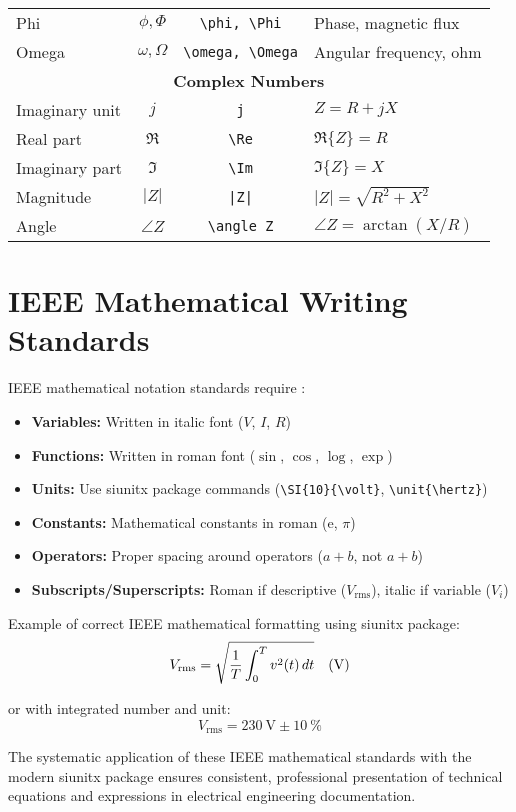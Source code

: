 \begin{table}[htbp]
{\begin{tabular}{|l|c|c|l|}
			Phi & $\phi, \Phi$ & \texttt{\textbackslash phi, \textbackslash Phi} & Phase, magnetic flux \\
			Omega & $\omega, \Omega$ & \texttt{\textbackslash omega, \textbackslash Omega} & Angular frequency, ohm \\
			\hline
			\multicolumn{4}{|c|}{\textbf{Complex Numbers}} \\
			\hline
			Imaginary unit & $j$ & \texttt{j} & $Z = R + jX$ \\
			Real part & $\Re$ & \texttt{\textbackslash Re} & $\Re\{Z\} = R$ \\
			Imaginary part & $\Im$ & \texttt{\textbackslash Im} & $\Im\{Z\} = X$ \\
			Magnitude & $|Z|$ & \texttt{|Z|} & $|Z| = \sqrt{R^2 + X^2}$ \\
			Angle & $\angle Z$ & \texttt{\textbackslash angle Z} & $\angle Z = \arctan(X/R)$ \\
			\hline
		\end{tabular}%
	}
\end{table}

\section{IEEE Mathematical Writing Standards}
\label{sec:ieee_math_standards}

IEEE mathematical notation standards require \cite{ieee2018style}:

\begin{itemize}
	\item \textbf{Variables:} Written in italic font ($V$, $I$, $R$)
	\item \textbf{Functions:} Written in roman font ($\sin$, $\cos$, $\log$, $\exp$)
	\item \textbf{Units:} Use siunitx package commands (\texttt{\textbackslash SI\{10\}\{\textbackslash volt\}}, \texttt{\textbackslash unit\{\textbackslash hertz\}})
	\item \textbf{Constants:} Mathematical constants in roman ($\mathrm{e}$, $\pi$)
	\item \textbf{Operators:} Proper spacing around operators ($a + b$, not $a+b$)
	\item \textbf{Subscripts/Superscripts:} Roman if descriptive ($V_{\mathrm{rms}}$), italic if variable ($V_i$)
\end{itemize}

Example of correct IEEE mathematical formatting using siunitx package:
\begin{equation}
	V_{\mathrm{rms}} = \sqrt{\frac{1}{T} \int_0^T v^2(t) \, dt} \quad \text{(\unit{\volt})}
	\label{eq:rms_voltage}
\end{equation}

or with integrated number and unit:
\begin{equation}
	V_{\mathrm{rms}} = \SI{230}{\volt} \pm \SI{10}{\percent}
	\label{eq:rms_voltage_example}
\end{equation}

The systematic application of these IEEE mathematical standards with the modern siunitx package ensures consistent, professional presentation of technical equations and expressions in electrical engineering documentation.